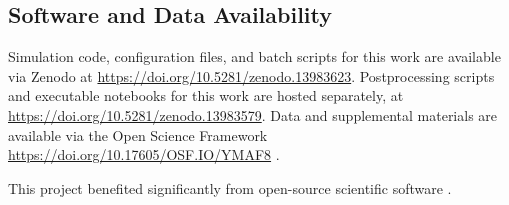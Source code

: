 \subsection{Software and Data Availability} \label{sec:materials}

Simulation code, configuration files, and batch scripts for this work are available via Zenodo at \url{https://doi.org/10.5281/zenodo.13983623}.
Postprocessing scripts and executable notebooks for this work are hosted separately, at \url{https://doi.org/10.5281/zenodo.13983579}.
Data and supplemental materials are available via the Open Science Framework \url{https://doi.org/10.17605/OSF.IO/YMAF8} \citep{foster2017open}.

This project benefited significantly from open-source scientific software \citep{2020SciPy-NMeth,harris2020array,reback2020pandas,mckinney-proc-scipy-2010,waskom2021seaborn,hunter2007matplotlib,moreno2023teeplot}.
